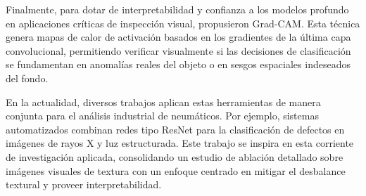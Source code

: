 Finalmente, para dotar de interpretabilidad y confianza a los modelos profundo en aplicaciones críticas de inspección visual, \citet{selvaraju2017grad} propusieron Grad-CAM. Esta técnica genera mapas de calor de activación basados en los gradientes de la última capa convolucional, permitiendo verificar visualmente si las decisiones de clasificación se fundamentan en anomalías reales del objeto o en sesgos espaciales indeseados del fondo.

En la actualidad, diversos trabajos aplican estas herramientas de manera conjunta para el análisis industrial de neumáticos. Por ejemplo, sistemas automatizados combinan redes tipo ResNet para la clasificación de defectos en imágenes de rayos X y luz estructurada. Este trabajo se inspira en esta corriente de investigación aplicada, consolidando un estudio de ablación detallado sobre imágenes visuales de textura con un enfoque centrado en mitigar el desbalance textural y proveer interpretabilidad.
